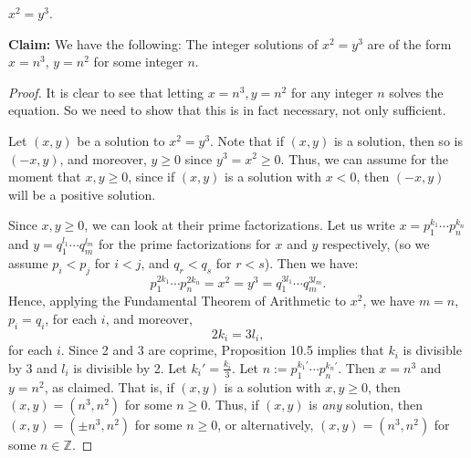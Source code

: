 \documentclass[11pt,dvipsnames]{book}
\numberwithin{equation}{section} %
\numberwithin{figure}{section} %
\numberwithin{table}{section} %
\begin{document}
\begin{exercise}
$x^2 = y^3$.


\begin{solution}

{\bf Claim:} We have the following:
The integer solutions of $x^2=y^3$ are of the form $x=n^3$, $y=n^2$ for some integer $n$.


\begin{proof}
 It is clear to see that letting $x=n^3, y=n^2$ for any integer $n$ solves the equation.  So we need to show that this is in fact necessary, not only sufficient.

Let $(x,y)$ be a solution to $x^2=y^3$. Note that if $(x,y)$ is a solution, then so is $(-x,y)$, and moreover, $y\geq 0$ since $y^3=x^2\geq 0$. Thus, we can assume for the moment that $x,y\geq 0$, since if  $(x,y)$ is a solution with $x<0$, then $(-x,y)$ will be a positive solution. 

Since $x,y\geq 0$, we can look at their prime factorizations. Let us write $x=p_1^{k_1}\cdots p_n^{k_n}$ and $y=q_1^{l_1}\cdots q_m^{l_m}$ for the prime factorizations for $x$ and $y$ respectively, (so we assume $p_i<p_j$ for $i<j$, and $q_r<q_s$ for $r<s$).  Then we have:
$$p_1^{2k_1}\cdots p_n^{2k_n} = x^2=y^3 = q_1^{3l_1}\cdots q_m^{3l_m}.$$
Hence, applying the Fundamental Theorem of Arithmetic to $x^2$, we have $m=n$, $p_i=q_i$, for each $i$, and moreover,
$$2k_i=3l_i,$$
for each $i$.  Since 2 and 3 are coprime, Proposition 10.5 implies that $k_i$ is divisible by 3 and $l_i$ is divisible by 2.  Let $k_i'=\frac{k_i}{3}$.  Let $n:= p_1^{k_1'}\cdots p_n^{k_n'}.$  Then $x=n^3$ and $y=n^2$, as claimed. That is, if $(x,y)$ is a solution with $x,y\geq 0$, then $(x,y)=(n^3,n^2)$ for some $n\geq 0$. Thus, if $(x,y)$ is {\it any } solution, then $(x,y)=(\pm n^3,n^2)$ for some $n\geq 0$, or alternatively, $(x,y)=(n^3,n^2)$ for some $n\in \mathbb{Z}$. 
\end{proof}


\end{solution}

\end{exercise}
%
%
%
%
%
%
\end{document}
